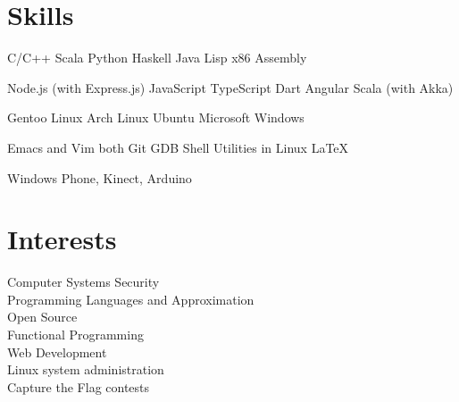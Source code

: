 \documentclass[a4paper]{deedy-resume} %
\begin{document}
\begin{minipage}[t]{0.33\textwidth}
  \sectionspace

  \section{Skills}

  \runsubsection{}
  C/C++ \textbullet{} Scala \textbullet{} Python \textbullet{} Haskell
  \textbullet{} Java \textbullet{} Lisp \textbullet{} x86 Assembly

  \sectionspace

  Node.js (with Express.js) \textbullet{} JavaScript \textbullet{} TypeScript
  \textbullet{} Dart \textbullet{} Angular \textbullet Scala (with Akka) \\

  \sectionspace

  Gentoo Linux \textbullet{} Arch Linux \textbullet{} Ubuntu \textbullet{}
  Microsoft Windows

  \sectionspace

  Emacs and Vim both \textbullet{} Git \textbullet{} GDB \textbullet{}
  Shell Utilities in Linux \textbullet{} LaTeX

  \sectionspace

  Windows Phone, Kinect, Arduino

  \section{Interests}
  Computer Systems Security\\
  Programming Languages and Approximation\\
  Open Source\\
  Functional Programming\\
  Web Development\\
  Linux system administration\\
  Capture the Flag contests

\end{minipage}
\hfill
\end{document}
